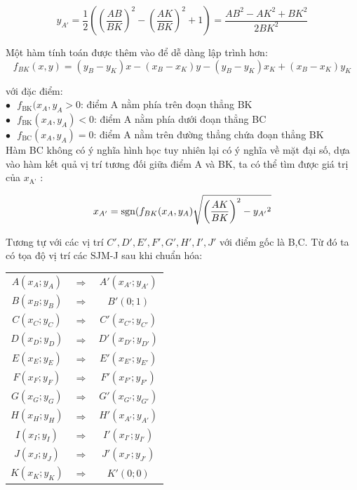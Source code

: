 \begin{equation}
{y_{A'}} = \frac{1}{2}\left( {{{\left( {\frac{{AB}}{{BK}}} \right)}^2} - {{\left( {\frac{{AK}}{{BK}}} \right)}^2} + 1} \right) = \frac{{A{B^2} - A{K^2} + B{K^2}}}{{2B{K^2}}}
\end{equation}

Một hàm tính toán được thêm vào để dễ dàng lập trình hơn:
\begin{equation}
{f_{BK}}(x,y) = ({y_B} - {y_K})x - ({x_B} - {x_K})y - ({y_B} - {y_K}){x_K} + ({x_B} - {x_K}){y_K}
\end{equation}

với đặc điểm:\\

$\bullet \text{   }  f_\text{BK}(x_A,y_A > 0$: điểm A nằm phía trên đoạn thẳng BK\\

$\bullet \text{   }  f_\text{BK}(x_A,y_A)< 0$: điểm A nằm phía dưới đoạn thẳng BC\\

$\bullet \text{   } f_\text{BC}(x_A,y_A)= 0$: điểm A nằm trên đường thẳng chứa đoạn thẳng BK\\

Hàm BC không có ý nghĩa hình học tuy nhiên lại có ý nghĩa về mặt đại số, dựa vào hàm kết quả vị trí tương đối giữa điểm A và BK, ta có thể tìm được giá trị của $x_\text{A'}$ :

\begin{equation}
{x_{A'}} = {\mathop{\rm sgn}} ({f_{BK}}({x_A},{y_A})\sqrt {{{\left( {\frac{{AK}}{{BK}}} \right)}^2} - {y_{A'}}^2} 
\end{equation}

Tương tự với các vị trí $C', D', E', F', G' , H' , I' , J'$ với điểm gốc là B,C. Từ đó ta có tọa độ vị trí các SJM-J sau khi chuẩn hóa:\*

\begin{tabular}{c c c}
$A(x_A; y_A)$ & $\Rightarrow$ & $A'(x_{A'}; y_{A'})$ \\ 
$B(x_B; y_B)$ & $\Rightarrow$ & $B'(0;1)$ \\ 
$C(x_C; y_C)$ & $\Rightarrow$ & $C'(x_{C'}; y_{C'})$ \\ 
$D(x_D; y_D)$ & $\Rightarrow$ & $D'(x_{D'}; y_{D'})$ \\ 
$E(x_E; y_E)$ & $\Rightarrow$ & $E'(x_{E'}; y_{E'})$ \\ 
$F(x_F; y_F)$ & $\Rightarrow$ & $F'(x_{F'}; y_{F'})$ \\ 
$G(x_G; y_G)$ & $\Rightarrow$ & $G'(x_{G'}; y_{G'})$ \\ 
$H(x_H; y_H)$ & $\Rightarrow$ & $H'(x_{A'}; y_{A'})$ \\ 
$I(x_I; y_I)$ & $\Rightarrow$ & $I'(x_{I'}; y_{I'})$ \\ 
$J(x_J; y_J)$ & $\Rightarrow$ & $J'(x_{J'}; y_{J'})$ \\ 
$K(x_K; y_K)$ & $\Rightarrow$ & $K'(0;0)$ \\ 
\end{tabular} \*

